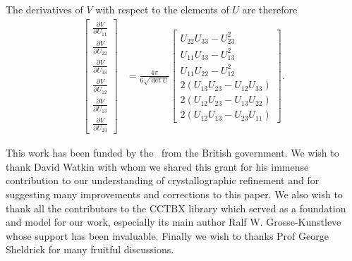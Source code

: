 \documentclass[pdf]{iucr}
\newcommand{\partialder}[2]{\frac{\partial #1}{\partial #2}}
\begin{document}
The derivatives of $V$ with respect to the elements of $U$ are therefore
\begin{align}
\begin{bmatrix}
 \partialder{V}{U_{11}}\\[0.5em]
 \partialder{V}{U_{22}}\\[0.5em]
 \partialder{V}{U_{33}}\\[0.5em]
 \partialder{V}{U_{12}}\\[0.5em]
 \partialder{V}{U_{13}}\\[0.5em]
 \partialder{V}{U_{23}}
\end{bmatrix}
 &= \frac{4\pi}{6\sqrt{\det U}}
\begin{bmatrix}
U_{22} U_{33}-U_{23}^2\\
U_{11} U_{33}-U_{13}^2\\
U_{11} U_{22}-U_{12}^2\\
2 (U_{13} U_{23}- U_{12} U_{33})\\
2 (U_{12} U_{23}- U_{13} U_{22})\\
2 (U_{12}U_{13}- U_{23} U_{11} )
\end{bmatrix}.
\end{align}


This work has been funded by the \ourEPSRCgrant\ from the British government. We wish to thank David Watkin with whom we shared this grant for his immense contribution to our understanding of crystallographic refinement and for suggesting many improvements and corrections to this paper. We also wish to thank all the contributors to the CCTBX library which served as a foundation and model for our work, especially its main author Ralf W. Grosse-Kunstleve whose support has been invaluable. Finally we wish to thanks Prof George Sheldrick for many fruitful discussions.

\end{document}
